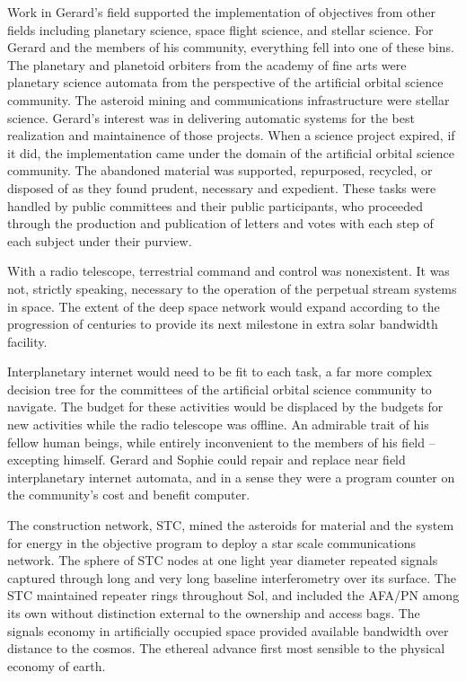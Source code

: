 Work in Gerard's field supported the implementation of objectives from
other fields including planetary science, space flight science, and
stellar science.  For Gerard and the members of his community,
everything fell into one of these bins.  The planetary and planetoid
orbiters from the academy of fine arts were planetary science automata
from the perspective of the artificial orbital science community.  The
asteroid mining and communications infrastructure were stellar
science.  Gerard's interest was in delivering automatic systems for
the best realization and maintainence of those projects.  When a
science project expired, if it did, the implementation came under the
domain of the artificial orbital science community.  The abandoned
material was supported, repurposed, recycled, or disposed of as they
found prudent, necessary and expedient.  These tasks were handled by
public committees and their public participants, who proceeded through
the production and publication of letters and votes with each step of
each subject under their purview.  

With a radio telescope, terrestrial command and control was
nonexistent.  It was not, strictly speaking, necessary to the
operation of the perpetual stream systems in space.  The extent of the
deep space network would expand according to the progression of
centuries to provide its next milestone in extra solar bandwidth
facility.  

Interplanetary internet would need to be fit to each task, a far more
complex decision tree for the committees of the artificial orbital
science community to navigate.  The budget for these activities would
be displaced by the budgets for new activities while the radio
telescope was offline.  An admirable trait of his fellow human beings,
while entirely inconvenient to the members of his field -- excepting
himself.  Gerard and Sophie could repair and replace near field
interplanetary internet automata, and in a sense they were a program
counter on the community's cost and benefit computer.



The construction network, STC, mined the asteroids for material and
the system for energy in the objective program to deploy a star scale
communications network.  The sphere of STC nodes at one light year
diameter repeated signals captured through long and very long baseline
interferometry over its surface.  The STC maintained repeater rings
throughout Sol, and included the AFA/PN among its own without
distinction external to the ownership and access bags.  The signals
economy in artificially occupied space provided available bandwidth
over distance to the cosmos.  The ethereal advance first most sensible
to the physical economy of earth.



